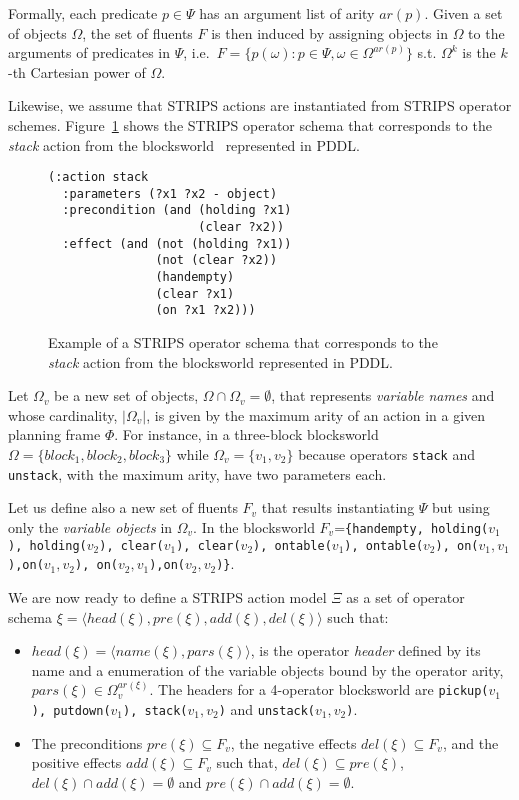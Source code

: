 \documentclass[letterpaper]{article} %
\newcommand{\tup}[1]{{\langle #1 \rangle}}
\begin{document}
Formally, each predicate $p\in\Psi$ has an argument list of arity $ar(p)$. Given a set of objects $\Omega$, the set of fluents $F$ is then induced by assigning objects in $\Omega$ to the arguments of predicates in $\Psi$, i.e.~$F=\{p(\omega):p\in\Psi,\omega\in\Omega^{ar(p)}\}$ s.t. $\Omega^k$ is the $k$-th Cartesian power of $\Omega$.

Likewise, we assume that STRIPS actions are instantiated from STRIPS operator schemes. Figure~\ref{fig:stack} shows the STRIPS operator schema that corresponds to the {\em stack} action from the blocksworld~\cite{slaney2001blocks} represented in PDDL.
\begin{figure}
\begin{footnotesize}
\begin{verbatim}
(:action stack
  :parameters (?x1 ?x2 - object)
  :precondition (and (holding ?x1)
                     (clear ?x2))
  :effect (and (not (holding ?x1))
               (not (clear ?x2))
               (handempty)
               (clear ?x1)
               (on ?x1 ?x2)))
\end{verbatim}
\end{footnotesize}
 \caption{\small Example of a STRIPS operator schema that corresponds to the {\em stack} action from the blocksworld represented in PDDL.}
\label{fig:stack}
\end{figure}

Let $\Omega_v$ be a new set of objects, $\Omega\cap\Omega_v=\emptyset$, that represents {\em variable names} and whose cardinality, $|\Omega_v|$, is given by the maximum arity of an action in a given planning frame $\Phi$. For instance, in a three-block blocksworld $\Omega=\{block_1, block_2, block_3\}$ while $\Omega_v=\{v_1, v_2\}$ because operators {\small\tt stack} and {\small\tt unstack}, with the maximum arity, have two parameters each.

Let us define also a new set of fluents $F_{v}$ that results instantiating $\Psi$ but using only the {\em variable objects} in $\Omega_v$. In the blocksworld $F_v$={\small\tt\{handempty, holding($v_1$), holding($v_2$), clear($v_1$), clear($v_2$), ontable($v_1$), ontable($v_2$), on($v_1,v_1$),on($v_1,v_2$), on($v_2,v_1$),on($v_2,v_2$)\}}.

We are now ready to define a STRIPS action model $\Xi$ as a set of operator schema $\xi=\tup{head(\xi),pre(\xi),add(\xi),del(\xi)}$ such that:
\begin{itemize}
\item $head(\xi)=\tup{name(\xi),pars(\xi)}$, is the operator {\em header} defined by its name and a enumeration of the variable objects bound by the operator arity, $pars(\xi)\in\Omega_v^{ar(\xi)}$. The headers for a 4-operator blocksworld are {\small\tt pickup($v_1$), putdown($v_1$), stack($v_1,v_2$)} and {\small\tt unstack($v_1,v_2$)}.
\item The preconditions $pre(\xi)\subseteq F_v$, the negative effects $del(\xi)\subseteq F_v$, and the positive effects $add(\xi)\subseteq F_v$ such that, $del(\xi)\subseteq pre(\xi)$, $del(\xi)\cap add(\xi)=\emptyset$ and $pre(\xi)\cap add(\xi)=\emptyset$.
\end{itemize}
\end{document}
